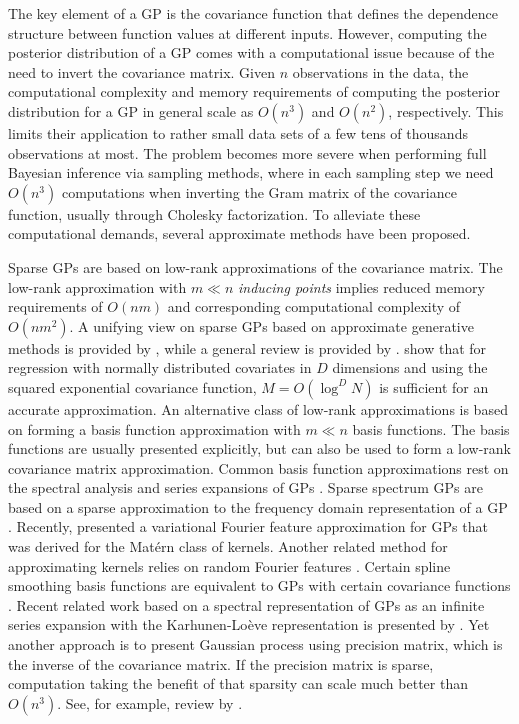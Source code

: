 The key element of a GP is the covariance function that defines the dependence structure between function values at different inputs. However, computing the posterior distribution of a GP comes with a computational issue because of the need to invert the covariance matrix. Given $n$ observations in the data, the computational complexity and memory requirements of computing the posterior distribution for a GP in general scale as $O(n^3)$ and $O(n^2)$, respectively. This limits their application to rather small data sets of a few tens of thousands observations at most. The problem becomes more severe when performing full Bayesian inference via sampling methods, where in each sampling step we need $O(n^3)$ computations when inverting the Gram matrix of the covariance function, usually through Cholesky factorization. To alleviate these computational demands, several approximate methods have been proposed. 

Sparse GPs are based on low-rank approximations of the covariance matrix. The low-rank approximation with $m \ll n$ {\it inducing points} implies reduced memory requirements of $O(nm)$ and corresponding computational complexity of $O(nm^2)$. A unifying view on sparse GPs based on approximate generative methods is provided by \citet{quinonero2005unifying}, while a general review is provided by \citet{rasmussen2006gaussian}. \citet{Burt+Rasmussen+vanderWilk:2019} show that for regression with normally distributed covariates in $D$ dimensions and using the squared exponential covariance function, $M=O(\log^DN)$ is sufficient for an accurate approximation.
An alternative class of low-rank approximations is based on forming a basis function approximation with $m \ll n$ basis functions. The basis functions are usually presented explicitly, but can also be used to form a low-rank covariance matrix approximation. Common basis function approximations rest on the spectral analysis and series expansions of GPs \citep{loeve1977probability,trees1968detection,adler1981geometry,cramer2013stationary}. Sparse spectrum GPs are based on a sparse approximation to the frequency domain representation of a GP \citep{lazaro2010sparse,quia2010sparse,gal2015improving}. Recently, \citet{hensman2017variational} presented a variational Fourier feature approximation for GPs that was derived for the Mat{\'e}rn class of kernels. Another related method for approximating kernels relies on random Fourier features  \citep{rahimi2008random,rahimi2009weighted}. Certain spline smoothing basis functions are equivalent to GPs with certain covariance functions \citep{wahba1990spline,Furrer+Nychka:2007}. Recent related work based on a spectral representation of GPs as an infinite series expansion with the Karhunen-Loève representation \citep[see, e.g.,][]{grenander1981abstract} is presented by \citet{JSSv090i10}.
Yet another approach is to present Gaussian process using precision matrix, which is the inverse of the covariance matrix. If the precision matrix is sparse, computation taking the benefit of that sparsity can scale much better than $O(n^3)$. See, for example, review by \citet{Lindgren+Havard:2022:spde}.

